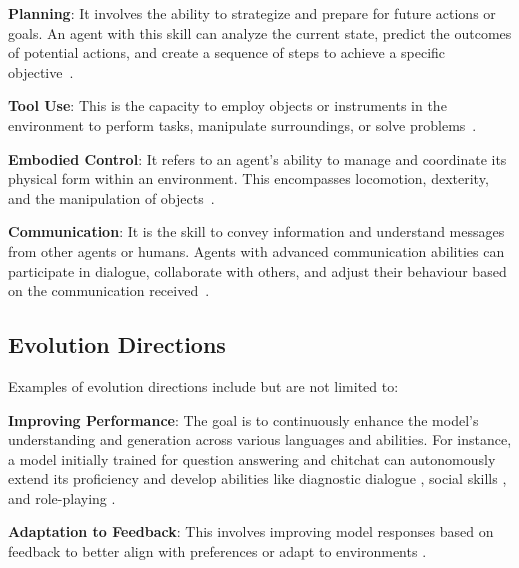 \documentclass[sn-basic, Numbered]{sn-jnl}%
\theoremstyle{thmstyleone}%
\theoremstyle{thmstyletwo}%
\theoremstyle{thmstylethree}%
\begin{document}
\noindent\textbf{Planning}:
It involves the ability to strategize and prepare for future actions or goals. An agent with this skill can analyze the current state, predict the outcomes of potential actions, and create a sequence of steps to achieve a specific objective~\cite{qiao2024autoact}. 

\noindent\textbf{Tool Use}:
This is the capacity to employ objects or instruments in the environment to perform tasks, manipulate surroundings, or solve problems~\cite{zhu2024knowagent}. 

\noindent\textbf{Embodied Control}:
It refers to an agent's ability to manage and coordinate its physical form within an environment. This encompasses locomotion, dexterity, and the manipulation of objects~\cite{bousmalis2023robocat}.

\noindent\textbf{Communication}:
It is the skill to convey information and understand messages from other agents or humans. Agents with advanced communication abilities can participate in dialogue, collaborate with others, and adjust their behaviour based on the communication received~\cite{ulmer2024bootstrapping}.


\subsection{Evolution Directions}
Examples of evolution directions include but are not limited to:

\noindent\textbf{Improving Performance}: The goal is to continuously enhance the model's understanding and generation across various languages and abilities. 
For instance, a model initially trained for question answering and chitchat can autonomously extend its proficiency and develop abilities like diagnostic dialogue \cite{tu2024towards}, social skills \cite{wang2024sotopia}, and role-playing \cite{lu2024large}.


\noindent\textbf{Adaptation to Feedback}: This involves improving model responses based on feedback to better align with preferences or adapt to environments \cite{yang2023rlcd, sun2024principle}. 
\end{document}
